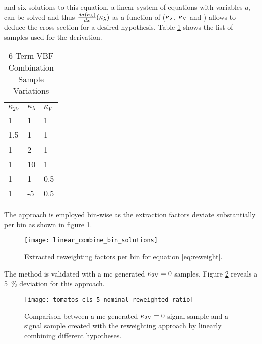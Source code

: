 and six solutions to this equation, a linear system of equations with variables $a_i$ can be solved and thus $\frac{d\sigma(\kappa_\lambda)}{d x}(\kappa_\lambda)$ as a function of ($\kappa_\lambda$, $\kappa_\text{V}$ and \ktwov) allows to deduce the cross-section for a desired hypothesis. Table \ref*{tab:vbf_hh_6term_varlist} shows the list of samples used for the derivation.
\begin{table}
    \centering
    \caption{6-Term VBF Combination Sample Variations}
    \label{tab:vbf_hh_6term_varlist}
    \begin{tabular}{ |l|l|l| }
        \hline
        \textbf {$\kappa_{2V}$} & \textbf {$\kappa_\lambda$} & \textbf {$\kappa_V$} \\
        \hline
        1                       & 1                          & 1                    \\
        1.5                     & 1                          & 1                    \\
        1                       & 2                          & 1                    \\
        1                       & 10                         & 1                    \\
        1                       & 1                          & 0.5                  \\
        1                       & -5                         & 0.5                  \\
        \hline
    \end{tabular}
\end{table}
The approach is employed bin-wise as the extraction factors deviate substantially per bin as shown in figure \ref{fig:linear_combine_bin_solutions}.
\begin{figure}
    \centering
    \texttt{[image: linear\_combine\_bin\_solutions]}
    \caption[]{Extracted reweighting factors per bin for equation \ref{eq:reweight}.}
    \label{fig:linear_combine_bin_solutions}
\end{figure}
The method is validated with a mc generated $\kappa_{\text{2V}}=0$ samples. Figure \ref{fig:tomatos_cls_5_nominal_reweighted_ratio} reveals a \qty[]{5}{\percent} deviation for this approach. 
\begin{figure}
    \centering
    \texttt{[image: tomatos\_cls\_5\_nominal\_reweighted\_ratio]}
    \caption[]{Comparison between a \ac{mc}-generated $\kappa_{\text{2V}}=0$ signal sample and a signal sample created with the reweighting approach by linearly combining different \ktwov hypotheses. }
    \label{fig:tomatos_cls_5_nominal_reweighted_ratio}
\end{figure}

